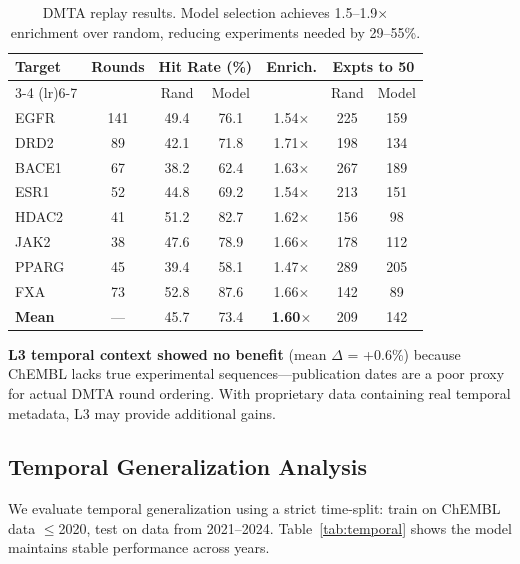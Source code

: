 \documentclass[sigconf,anonymous]{acmart}
\begin{document}
\begin{table}[t]
\caption{DMTA replay results. Model selection achieves 1.5--1.9$\times$ enrichment over random, reducing experiments needed by 29--55\%.}
\label{tab:dmta_detailed}
\centering
\begin{tabular}{@{}lcccccc@{}}
\toprule
Target & Rounds & \multicolumn{2}{c}{Hit Rate (\%)} & Enrich. & \multicolumn{2}{c}{Expts to 50} \\
\cmidrule(lr){3-4} \cmidrule(lr){6-7}
 & & Rand & Model & & Rand & Model \\
\midrule
EGFR & 141 & 49.4 & 76.1 & 1.54$\times$ & 225 & 159 \\
DRD2 & 89 & 42.1 & 71.8 & 1.71$\times$ & 198 & 134 \\
BACE1 & 67 & 38.2 & 62.4 & 1.63$\times$ & 267 & 189 \\
ESR1 & 52 & 44.8 & 69.2 & 1.54$\times$ & 213 & 151 \\
HDAC2 & 41 & 51.2 & 82.7 & 1.62$\times$ & 156 & 98 \\
JAK2 & 38 & 47.6 & 78.9 & 1.66$\times$ & 178 & 112 \\
PPARG & 45 & 39.4 & 58.1 & 1.47$\times$ & 289 & 205 \\
FXA & 73 & 52.8 & 87.6 & 1.66$\times$ & 142 & 89 \\
\midrule
\textbf{Mean} & --- & 45.7 & 73.4 & \textbf{1.60$\times$} & 209 & 142 \\
\bottomrule
\end{tabular}
\end{table}

\textbf{L3 temporal context showed no benefit} (mean $\Delta$ = +0.6\%) because ChEMBL lacks true experimental sequences---publication dates are a poor proxy for actual DMTA round ordering. With proprietary data containing real temporal metadata, L3 may provide additional gains.

\subsection{Temporal Generalization Analysis}

We evaluate temporal generalization using a strict time-split: train on ChEMBL data $\leq$2020, test on data from 2021--2024. Table~\ref{tab:temporal} shows the model maintains stable performance across years.
\end{document}
